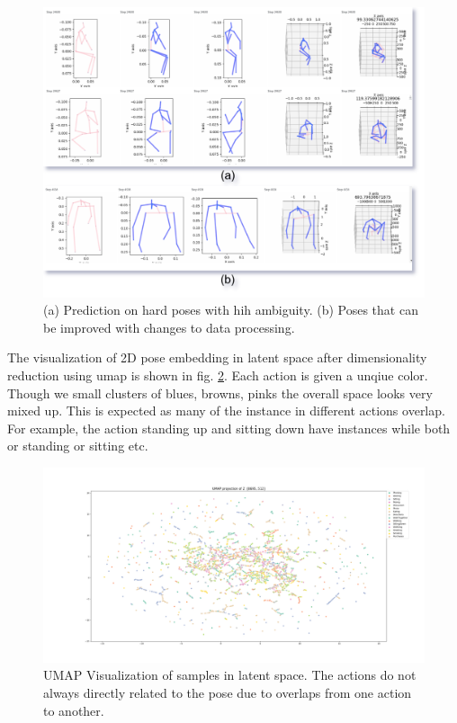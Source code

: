 \begin{figure}[!h]
    \centering
    \includegraphics[scale=0.2]{figures/bad_samples.png}
    \caption{(a) Prediction on hard poses with hih ambiguity. (b) Poses that can be improved with changes to data processing.}
    \label{fig:bad_samples}
\end{figure}



The visualization of 2D pose embedding in latent space after dimensionality reduction using \ac{umap} is shown in 
fig. \ref{fig:latentspace}. Each action is given a unqiue color. Though we small clusters of blues, browns, pinks the overall space looks very mixed up. This is expected as many of the instance in different actions overlap. For example, the action standing up and sitting down have instances while both or standing or sitting etc.  

\begin{figure}[h]
    \centering
    \includegraphics[width=\textwidth]{figures/umap.png}
    \caption{UMAP Visualization of samples in latent space. The actions do not always directly related to the pose due to overlaps from one action to another.}
    \label{fig:latentspace}
\end{figure}